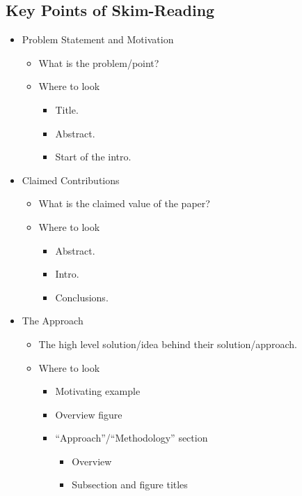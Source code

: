 \documentclass{article}
\begin{document}
\subsection{Key Points of Skim-Reading}

\begin{itemize}
    \item Problem Statement and Motivation
    \begin{itemize}
        \item What is the problem/point?
        \item Where to look
        \begin{itemize}
            \item Title.
            \item Abstract.
            \item Start of the intro.
        \end{itemize}
    \end{itemize}
    \item Claimed Contributions
    \begin{itemize}
        \item What is the claimed value of the paper?
        \item Where to look
        \begin{itemize}
            \item Abstract.
            \item Intro.
            \item Conclusions.
        \end{itemize}
    \end{itemize}
    \item The Approach
    \begin{itemize}
        \item The high level solution/idea behind their solution/approach.
        \item Where to look
        \begin{itemize}
            \item Motivating example
            \item Overview figure
            \item ``Approach''/``Methodology'' section
            \begin{itemize}
                \item Overview
                \item Subsection and figure titles
            \end{itemize}
        \end{itemize}

\end{itemize}
\end{itemize}
\end{document}

